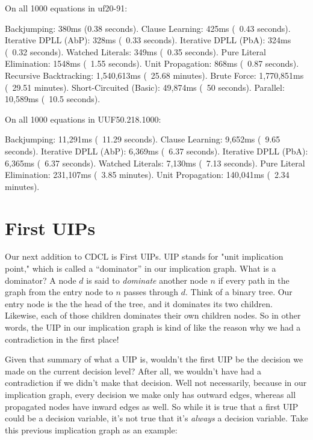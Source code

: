 \documentclass[../main.tex]{subfiles}
\begin{document}
\begin{FVerbatim}
On all 1000 equations in uf20-91:

Backjumping:               380ms (0.38 seconds).
Clause Learning:           425ms (~0.43 seconds).
Iterative DPLL (AbP):      328ms (~0.33 seconds).
Iterative DPLL (PbA):      324ms (~0.32 seconds).
Watched Literals:          349ms (~0.35 seconds).
Pure Literal Elimination:  1548ms (~1.55 seconds).
Unit Propagation:          868ms (~0.87 seconds).
Recursive Backtracking:    1,540,613ms (~25.68 minutes).
Brute Force:               1,770,851ms (~29.51 minutes).
Short-Circuited (Basic):   49,874ms (~50 seconds).
Parallel:                  10,589ms (~10.5 seconds).

On all 1000 equations in UUF50.218.1000:

Backjumping:              11,291ms (~11.29 seconds).
Clause Learning:          9,652ms (~9.65 seconds).
Iterative DPLL (AbP):     6,369ms (~6.37 seconds).
Iterative DPLL (PbA):     6,365ms (~6.37 seconds).
Watched Literals:         7,130ms (~7.13 seconds).
Pure Literal Elimination: 231,107ms (~3.85 minutes).
Unit Propagation:         140,041ms (~2.34 minutes).
\end{FVerbatim}

\section{First UIPs}

Our next addition to CDCL is First UIPs. UIP stands for "unit implication point," which 
is called a ``dominator'' in our implication graph. What is a dominator? A node $d$ is said 
to \textit{dominate} another node $n$ if every path in the graph from the entry node to $n$ 
passes through $d$. Think of a binary tree. Our entry node is the the head of the tree, and 
it dominates its two children. Likewise, each of those children dominates their own children 
nodes. So in other words, the UIP in our implication graph is kind of like the reason why 
we had a contradiction in the first place!

Given that summary of what a UIP is, wouldn't the first UIP be the decision we made on 
the current decision level? After all, we wouldn't have had a contradiction if we didn't 
make that decision. Well not necessarily, because in our implication graph, every decision 
we make only has outward edges, whereas all propagated nodes have inward edges as well. 
So while it is true that a first UIP could be a decision variable, it's not true that it's 
\textit{always} a decision variable. Take this previous implication graph as an example:
\end{document}

